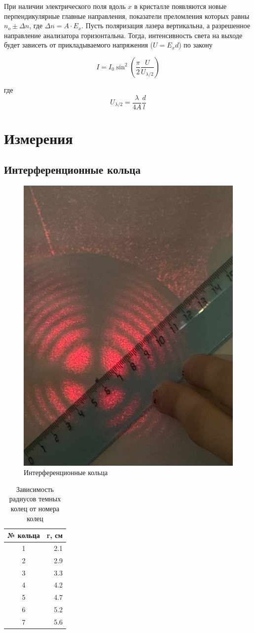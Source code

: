 \documentclass{article}
\begin{document}
При наличии электрического поля вдоль $x$ в кристалле появляются новые перпендикулярные
главные направления, показатели преломления которых равны $n_o \pm \Delta n$, где
$\Delta n = A \cdot E_{x}$. Пусть поляризация лазера вертикальна, а разрешенное
направление анализатора горизонтальна. Тогда, интенсивность света на выходе
будет зависеть от прикладываемого напряжения ($U = E_x d$) по закону

\begin{equation}
    I = I_0 \sin^2\left(\frac{\pi}{2}\frac{U}{U_{\lambda/2}}\right)
    \label{eq:pokkels}
\end{equation}

где
\begin{equation}
    U_{\lambda/2} = \frac{\lambda}{4A} \frac{d}{l}
    \label{eq:poluvolnovoe_napryajenie}
\end{equation}

\vspace{1cm}
\section{Измерения}
\subsection{Интерференционные кольца}
\begin{figure}[h]
    \center\includegraphics[width = 0.5\linewidth]{koltsa.png}
    \caption{Интерференционные кольца}\label{fig:koltsa}
\end{figure}

\begin{table}[h]
\begin{center}
\begin{tabular}{cr}
\toprule
 № кольца &  r, см \\
\midrule
 1 & 2.1 \\
 2 & 2.9 \\
 3 & 3.3 \\
 4 & 4.2 \\
 5 & 4.7 \\
 6 & 5.2 \\
 7 & 5.6 \\
\bottomrule
\end{tabular}
\caption{Зависимость радиусов темных колец от номера колец}
\end{center}
\end{table}
\end{document}
